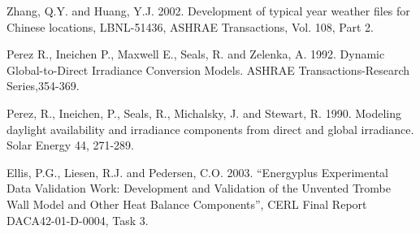 Zhang, Q.Y. and Huang, Y.J. 2002. Development of typical year weather files for Chinese locations, LBNL-51436, ASHRAE Transactions, Vol. 108, Part 2.

Perez R., Ineichen P., Maxwell E., Seals, R. and Zelenka, A. 1992. Dynamic Global-to-Direct Irradiance Conversion Models. ASHRAE Transactions-Research Series,354-369.

Perez, R., Ineichen, P., Seals, R., Michalsky, J. and Stewart, R. 1990. Modeling daylight availability and irradiance components from direct and global irradiance. Solar Energy 44, 271-289.

Ellis, P.G., Liesen, R.J. and Pedersen, C.O. 2003. ``Energyplus Experimental Data Validation Work: Development and Validation of the Unvented Trombe Wall Model and Other Heat Balance Components'', CERL Final Report DACA42-01-D-0004, Task 3.
